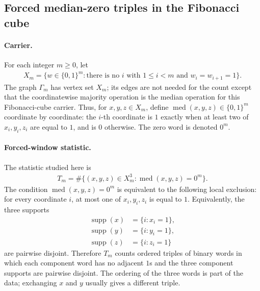 \subsection{Forced median-zero triples in the Fibonacci cube}\label{sec:window-fibonacci-cube-median-zero-triple}

\paragraph{Carrier.}
For each integer $m \geq 0$, let
$$
\begin{aligned}
X_m=\{w\in \{0,1\}^m : \text{there is no }i\text{ with }1\leq i<m\text{ and }w_i=w_{i+1}=1\}.
\end{aligned}
$$
The graph $\Gamma_m$ has vertex set $X_m$; its edges are not needed for the count except that the coordinatewise majority operation is the median operation for this Fibonacci-cube carrier. Thus, for $x,y,z\in X_m$, define $\operatorname{med}(x,y,z)\in \{0,1\}^m$ coordinate by coordinate: the $i$-th coordinate is $1$ exactly when at least two of $x_i,y_i,z_i$ are equal to $1$, and is $0$ otherwise. The zero word is denoted $0^m$.

\paragraph{Forced-window statistic.}
The statistic studied here is
$$
\begin{aligned}
T_m=\#\{(x,y,z)\in X_m^3 : \operatorname{med}(x,y,z)=0^m\}.
\end{aligned}
$$
The condition $\operatorname{med}(x,y,z)=0^m$ is equivalent to the following local exclusion: for every coordinate $i$, at most one of $x_i,y_i,z_i$ is equal to $1$. Equivalently, the three supports
$$
\begin{aligned}
\operatorname{supp}(x)&=\{i:x_i=1\},\\
\operatorname{supp}(y)&=\{i:y_i=1\},\\
\operatorname{supp}(z)&=\{i:z_i=1\}
\end{aligned}
$$
are pairwise disjoint. Therefore $T_m$ counts ordered triples of binary words in which each component word has no adjacent $1$s and the three component supports are pairwise disjoint. The ordering of the three words is part of the data; exchanging $x$ and $y$ usually gives a different triple.

